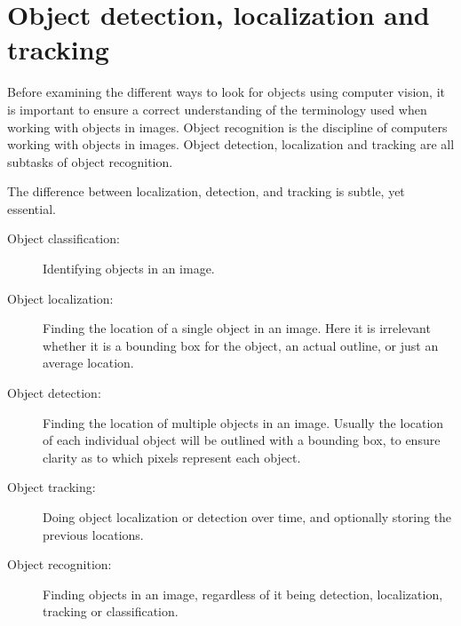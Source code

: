 \section{Object detection, localization and tracking}\label{sec:anal:objdet}
Before examining the different ways to look for objects using computer vision, it is important to ensure a correct understanding of the terminology used when working with objects in images.
Object recognition is the discipline of computers working with objects in images.
Object detection, localization and tracking are all subtasks of object recognition.

The difference between localization, detection, and tracking is subtle, yet essential\cite{objecttrackdetect}.
\begin{description}
    \item[Object classification:] Identifying objects in an image.
    \item[Object localization:] Finding the location of a single object in an image{.} Here it is irrelevant whether it is a bounding box for the object, an actual outline, or just an average location. 
    \item[Object detection:] Finding the location of multiple objects in an image{.} Usually the location of each individual object will be outlined with a bounding box, to ensure clarity as to which pixels represent each object.
    \item[Object tracking:] Doing object localization or detection over time, and optionally storing the previous locations.
    \item[Object recognition:] Finding objects in an image, regardless of it being detection, localization, tracking or classification. 
\end{description}
